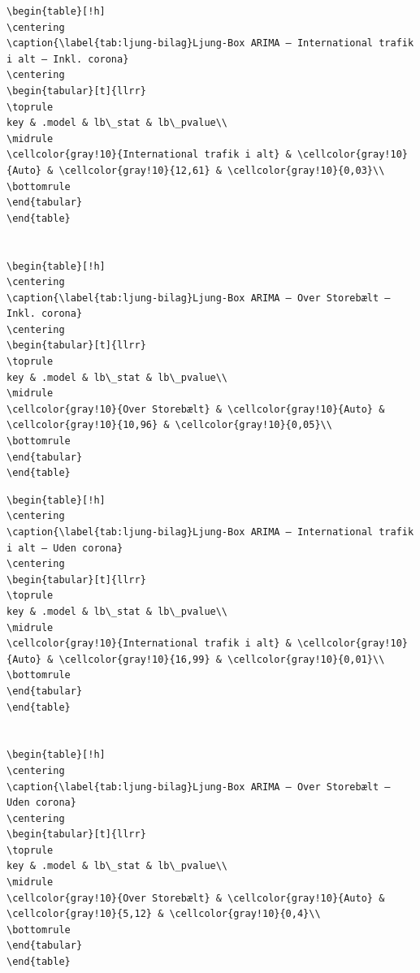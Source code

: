 \documentclass[
  danish,
]{article}
\begin{document}
\begin{verbatim}
\begin{table}[!h]
\centering
\caption{\label{tab:ljung-bilag}Ljung-Box ARIMA – International trafik i alt – Inkl. corona}
\centering
\begin{tabular}[t]{llrr}
\toprule
key & .model & lb\_stat & lb\_pvalue\\
\midrule
\cellcolor{gray!10}{International trafik i alt} & \cellcolor{gray!10}{Auto} & \cellcolor{gray!10}{12,61} & \cellcolor{gray!10}{0,03}\\
\bottomrule
\end{tabular}
\end{table}


\begin{table}[!h]
\centering
\caption{\label{tab:ljung-bilag}Ljung-Box ARIMA – Over Storebælt – Inkl. corona}
\centering
\begin{tabular}[t]{llrr}
\toprule
key & .model & lb\_stat & lb\_pvalue\\
\midrule
\cellcolor{gray!10}{Over Storebælt} & \cellcolor{gray!10}{Auto} & \cellcolor{gray!10}{10,96} & \cellcolor{gray!10}{0,05}\\
\bottomrule
\end{tabular}
\end{table}
\end{verbatim}

\begin{verbatim}
\begin{table}[!h]
\centering
\caption{\label{tab:ljung-bilag}Ljung-Box ARIMA – International trafik i alt – Uden corona}
\centering
\begin{tabular}[t]{llrr}
\toprule
key & .model & lb\_stat & lb\_pvalue\\
\midrule
\cellcolor{gray!10}{International trafik i alt} & \cellcolor{gray!10}{Auto} & \cellcolor{gray!10}{16,99} & \cellcolor{gray!10}{0,01}\\
\bottomrule
\end{tabular}
\end{table}


\begin{table}[!h]
\centering
\caption{\label{tab:ljung-bilag}Ljung-Box ARIMA – Over Storebælt – Uden corona}
\centering
\begin{tabular}[t]{llrr}
\toprule
key & .model & lb\_stat & lb\_pvalue\\
\midrule
\cellcolor{gray!10}{Over Storebælt} & \cellcolor{gray!10}{Auto} & \cellcolor{gray!10}{5,12} & \cellcolor{gray!10}{0,4}\\
\bottomrule
\end{tabular}
\end{table}
\end{verbatim}
\end{document}
